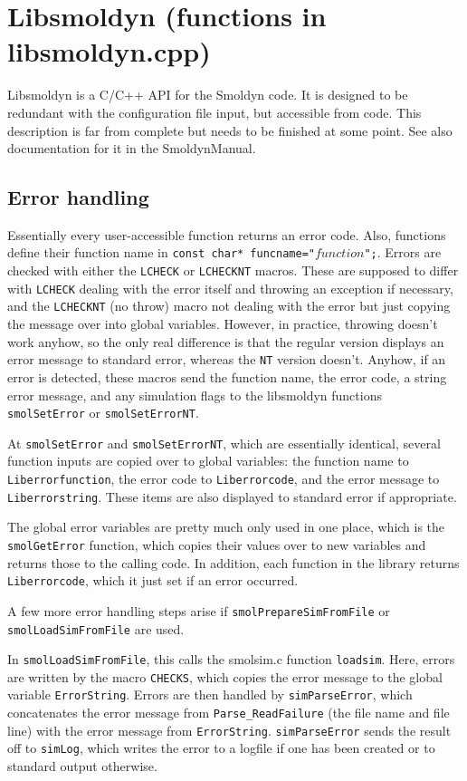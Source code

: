 \documentclass {scrbook}
\newcommand {\ttt} {\texttt}
\begin{document}
\section{Libsmoldyn (functions in libsmoldyn.cpp)}

Libsmoldyn is a C/C++ API for the Smoldyn code. It is designed to be redundant with the configuration file input, but accessible from code. This description is far from complete but needs to be finished at some point. See also documentation for it in the SmoldynManual.

\subsection{Error handling}

Essentially every user-accessible function returns an error code. Also, functions define their function name in \ttt{const char* funcname="}$function$\ttt{";}. Errors are checked with either the \ttt{LCHECK} or \ttt{LCHECKNT} macros. These are supposed to differ with \ttt{LCHECK} dealing with the error itself and throwing an exception if necessary, and the \ttt{LCHECKNT} (no throw) macro not dealing with the error but just copying the message over into global variables. However, in practice, throwing doesn't work anyhow, so the only real difference is that the regular version displays an error message to standard error, whereas the \ttt{NT} version doesn't. Anyhow, if an error is detected, these macros send the function name, the error code, a string error message, and any simulation flags to the libsmoldyn functions \ttt{smolSetError} or \ttt{smolSetErrorNT}.

At \ttt{smolSetError} and \ttt{smolSetErrorNT}, which are essentially identical, several function inputs are copied over to global variables: the function name to \ttt{Liberrorfunction}, the error code to \ttt{Liberrorcode}, and the error message to \ttt{Liberrorstring}. These items are also displayed to standard error if appropriate.

The global error variables are pretty much only used in one place, which is the \ttt{smolGetError} function, which copies their values over to new variables and returns those to the calling code. In addition, each function in the library returns \ttt{Liberrorcode}, which it just set if an error occurred.

A few more error handling steps arise if \ttt{smolPrepareSimFromFile} or \ttt{smolLoadSimFromFile} are used.

In \ttt{smolLoadSimFromFile}, this calls the smolsim.c function \ttt{loadsim}. Here, errors are written by the macro \ttt{CHECKS}, which copies the error message to the global variable \ttt{ErrorString}. Errors are then handled by \ttt{simParseError}, which concatenates the error message from \ttt{Parse\_ReadFailure} (the file name and file line) with the error message from \ttt{ErrorString}. \ttt{simParseError} sends the result off to \ttt{simLog}, which writes the error to a logfile if one has been created or to standard output otherwise.
\end{document}
